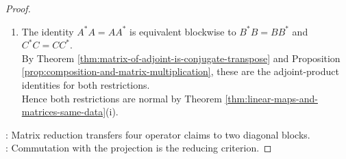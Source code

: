 \begin{corollary}
\begin{proof}
\begin{enumerate}[label=(\roman*)]
The identity $\mathcal{V}=\mathcal{U}\oplus\mathcal{U}^{\perp}$ holds by Theorem \ref{thm:orthogonal-direct-sum-decomposition}. Thus $(\mathcal{U},\mathcal{U}^{\perp})$ reduces $T$, and $(T|_{\mathcal{U}})^*=(T^*)|_{\mathcal{U}}$ by Theorem \ref{thm:adjoint-invariant-subspace-orthogonal-complement}(iii).
\item The identity $A^*A=AA^*$ is equivalent blockwise to $B^*B=BB^*$ and $C^*C=CC^*$.\\
By Theorem \ref{thm:matrix-of-adjoint-is-conjugate-transpose} and Proposition \ref{prop:composition-and-matrix-multiplication}, these are the adjoint-product identities for both restrictions.\\
Hence both restrictions are normal by Theorem \ref{thm:linear-maps-and-matrices-same-data}(i).
\end{enumerate}
: Matrix reduction transfers four operator claims to two diagonal blocks.\\
: Commutation with the projection is the reducing criterion.
\end{proof}
\end{corollary}


